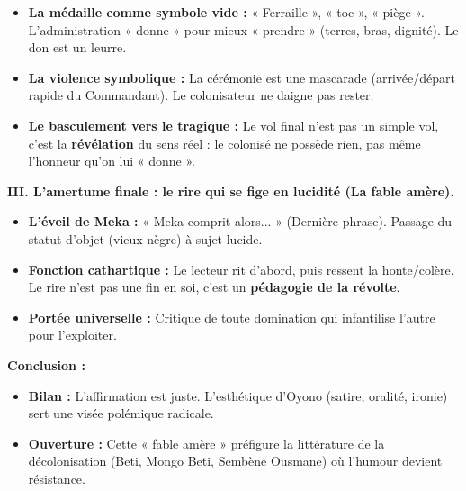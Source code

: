 \documentclass[11pt]{article}
\begin{document}
\begin{exoresolu}
\begin{itemize}
    \item \textbf{La médaille comme symbole vide :} « Ferraille », « toc », « piège ». L'administration « donne » pour mieux « prendre » (terres, bras, dignité). Le don est un leurre.
    \item \textbf{La violence symbolique :} La cérémonie est une mascarade (arrivée/départ rapide du Commandant). Le colonisateur ne daigne pas rester.
    \item \textbf{Le basculement vers le tragique :} Le vol final n'est pas un simple vol, c'est la \textbf{révélation} du sens réel : le colonisé ne possède rien, pas même l'honneur qu'on lui « donne ».
\end{itemize}
\textbf{III. L'amertume finale : le rire qui se fige en lucidité (La fable amère).}
\begin{itemize}
    \item \textbf{L'éveil de Meka :} « Meka comprit alors... » (Dernière phrase). Passage du statut d'objet (vieux nègre) à sujet lucide.
    \item \textbf{Fonction cathartique :} Le lecteur rit d'abord, puis ressent la honte/colère. Le rire n'est pas une fin en soi, c'est un \textbf{pédagogie de la révolte}.
    \item \textbf{Portée universelle :} Critique de toute domination qui infantilise l'autre pour l'exploiter.
\end{itemize}
\textbf{Conclusion :}
\begin{itemize}
    \item \textbf{Bilan :} L'affirmation est juste. L'esthétique d'Oyono (satire, oralité, ironie) sert une visée polémique radicale.
    \item \textbf{Ouverture :} Cette « fable amère » préfigure la littérature de la décolonisation (Beti, Mongo Beti, Sembène Ousmane) où l'humour devient résistance.
\end{itemize}
\end{exoresolu}
\end{document}
